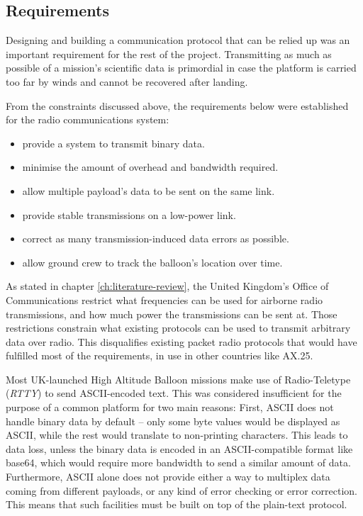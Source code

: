 \subsection{Requirements}
\label{ssec:requirements}

Designing and building a communication protocol that can be relied up was an
important requirement for the rest of the project. Transmitting as much as
possible of a mission's scientific data is primordial in case the platform
is carried too far by winds and cannot be recovered after landing.

From the constraints discussed above, the requirements below were established
for the radio communications system:

\begin{itemize}
\item provide a system to transmit binary data.%
\item minimise the amount of overhead and bandwidth required.%
\item allow multiple payload's data to be sent on the same link.%
\item provide stable transmissions on a low-power link.%
\item correct as many transmission-induced data errors as possible.%
\item allow ground crew to track the balloon's location over time.%
\end{itemize}

As stated in chapter \ref{ch:literature-review}, the United Kingdom's Office
of Communications restrict what frequencies can be used for airborne
radio transmissions, and how much power the transmissions can be sent at.
Those restrictions constrain what existing protocols can be used to transmit
arbitrary data over radio. This disqualifies existing packet radio protocols
that would have fulfilled most of the requirements, in use in other countries
like AX.25.

Most UK-launched High Altitude Balloon missions make use of Radio-Teletype
(\textit{RTTY}) to send ASCII-encoded text. This was considered insufficient
for the purpose of a common platform for two main reasons: First, ASCII does
not handle binary data by default -- only some byte values would be displayed
as ASCII, while the rest would translate to non-printing characters. This leads
to data loss, unless the binary data is encoded in an ASCII-compatible format
like base64, which would require more bandwidth to send a similar amount of
data. Furthermore, ASCII alone does not provide either a way to multiplex data
coming from different payloads, or any kind of error checking or error
correction. This means that such facilities must be built on top of the
plain-text protocol.

